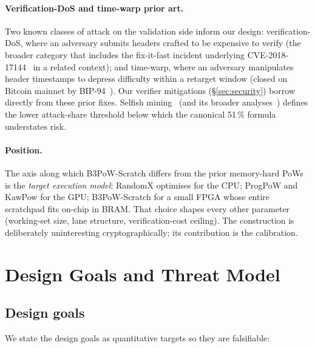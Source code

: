 \documentclass[11pt,a4paper]{article}
\theoremstyle{plain}
\theoremstyle{definition}
\theoremstyle{remark}
\begin{document}
\paragraph{Verification-DoS and time-warp prior art.}
Two known classes of attack on the validation side inform our design:
verification-DoS, where an adversary submits headers crafted to be
expensive to verify (the broader category that includes the
fix-it-fast incident underlying CVE-2018-17144~\cite{cve2018-17144}
in a related context); and time-warp, where an adversary manipulates
header timestamps to depress difficulty within a retarget window
(closed on Bitcoin mainnet by BIP-94~\cite{bip94}). Our verifier
mitigations (\S\ref{sec:security}) borrow directly from these
prior fixes. Selfish mining~\cite{eyal2014selfish} (and its
broader analyses~\cite{bonneau2015sok,sapirshtein2016selfish})
defines the lower attack-share threshold below which the canonical
51\,\% formula understates risk.

\paragraph{Position.} The axis along which B3PoW-Scratch differs
from the prior memory-hard PoWs is the \emph{target execution
model}: RandomX optimises for the CPU; ProgPoW and KawPow for the
GPU; B3PoW-Scratch for a small FPGA whose entire scratchpad fits
on-chip in BRAM. That choice shapes every other parameter
(working-set size, lane structure, verification-cost ceiling). The
construction is deliberately uninteresting cryptographically; its
contribution is the calibration.

\section{Design Goals and Threat Model}\label{sec:goals}

\subsection{Design goals}\label{sec:goals-d}

We state the design goals as quantitative targets so they are
falsifiable:
\end{document}
